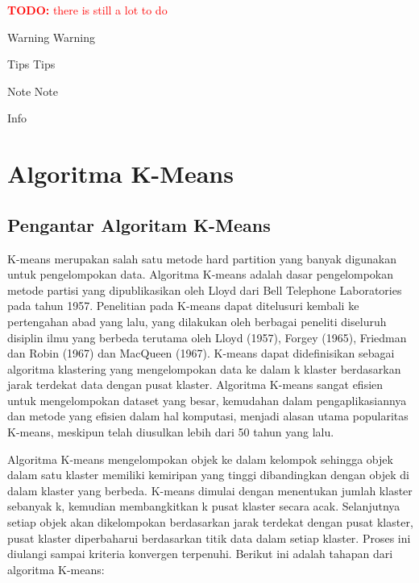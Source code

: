 \documentclass[
]{elegantbook}
\begin{document}
\textcolor{red}{\textbf{TODO: }{there is still a lot to do}}

\begin{rmdwarn}{Warning}
Warning

\end{rmdwarn}

\begin{rmdtip}{Tips}
Tips

\end{rmdtip}

\begin{rmdnote}{Note}
Note

\end{rmdnote}

Info

\hypertarget{algoritma-k-means}{%
\chapter{Algoritma K-Means}\label{algoritma-k-means}}

\hypertarget{pengantar-algoritam-k-means}{%
\section{Pengantar Algoritam K-Means}\label{pengantar-algoritam-k-means}}

K-means merupakan salah satu metode hard partition yang banyak digunakan untuk pengelompokan data. Algoritma K-means adalah dasar pengelompokan metode partisi yang dipublikasikan oleh Lloyd dari Bell Telephone Laboratories pada tahun 1957. Penelitian pada K-means dapat ditelusuri kembali ke pertengahan abad yang lalu, yang dilakukan oleh berbagai peneliti diseluruh disiplin ilmu yang berbeda terutama oleh Lloyd (1957), Forgey (1965), Friedman dan Robin (1967) dan MacQueen (1967). K-means dapat didefinisikan sebagai algoritma klastering yang mengelompokan data ke dalam k klaster berdasarkan jarak terdekat data dengan pusat klaster. Algoritma K-means sangat efisien untuk mengelompokan dataset yang besar, kemudahan dalam pengaplikasiannya dan metode yang efisien dalam hal komputasi, menjadi alasan utama popularitas K-means, meskipun telah diusulkan lebih dari 50 tahun yang lalu.

Algoritma K-means mengelompokan objek ke dalam kelompok sehingga objek dalam satu klaster memiliki kemiripan yang tinggi dibandingkan dengan objek di dalam klaster yang berbeda. K-means dimulai dengan menentukan jumlah klaster sebanyak k, kemudian membangkitkan k pusat klaster secara acak. Selanjutnya setiap objek akan dikelompokan berdasarkan jarak terdekat dengan pusat klaster, pusat klaster diperbaharui berdasarkan titik data dalam setiap klaster. Proses ini diulangi sampai kriteria konvergen terpenuhi. Berikut ini adalah tahapan dari algoritma K-means:
\end{document}
